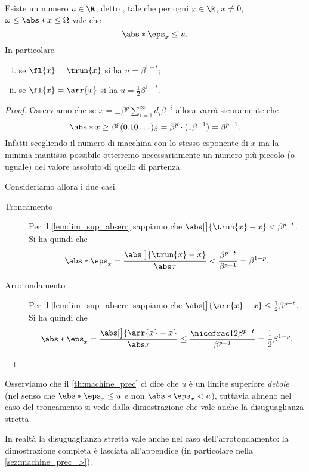 \begin{theorem}
    \label{th:machine_prec}
    Esiste un numero $u \in \R$, detto , tale che per ogni $x \in \R$, $x \neq 0$, $\omega \leq \abs*{x}\leq \Omega$ vale che \[
        \abs*{\eps_x} \leq u.
    \] In particolare \begin{enumerate}[(i)]
        \item se $\fl{x} = \trun{x}$ si ha $u = \beta^{1-t}$;
        \item se $\fl{x} = \arr{x}$ si ha $u = \frac12\beta^{1-t}$. 
    \end{enumerate}
\end{theorem}
\begin{proof}
    Osserviamo che se $x = \pm\beta^p \sum_{i=1}^\infty d_i\beta^{-i}$ allora varrà sicuramente che \[
        \abs*{x} \geq \beta^p (0.10\dots)_\beta = \beta^p \cdot (1 \beta^{-1}) = \beta^{p-1}.
    \] Infatti scegliendo il numero di macchina con lo stesso esponente di $x$ ma la minima mantissa possibile otterremo necessariamente un numero più piccolo (o uguale) del valore assoluto di quello di partenza.

    Consideriamo allora i due casi.
    \begin{description}
        \item[Troncamento] Per il \autoref{lem:lim_sup_abserr} sappiamo che $\abs[\big]{\trun{x} - x} < \beta^{p-t}$. Si ha quindi che \[
                \abs*{\eps_x} 
            = \frac{\abs[\big]{\trun{x} - x}}{\abs x} 
            < \frac{\beta^{p-t}}{\beta^{p-1}}
            = \beta^{1-p}.
        \] 
        \item[Arrotondamento] Per il \autoref{lem:lim_sup_abserr} sappiamo che $\abs[\big]{\arr{x} - x} \leq \frac12\beta^{p-t}$. Si ha quindi che \[
                 \abs*{\eps_x} 
            =    \frac{\abs[\big]{\arr{x} - x}}{\abs x} 
            \leq \frac{\nicefrac12\beta^{p-t}}{\beta^{p-1}}
            =    \frac12\beta^{1-p}. \qedhere
        \]
    \end{description}
\end{proof}

Osserviamo che il \autoref{th:machine_prec} ci dice che $u$ è un limite superiore \emph{debole} (nel senso che $\abs*{\eps_x} \leq u$ e non $\abs*{\eps_x} < u$), tuttavia almeno nel caso del troncamento si vede dalla dimostrazione che vale anche la disuguaglianza stretta. 

In realtà la disuguaglianza stretta vale anche nel caso dell'arrotondamento: la dimostrazione completa è lasciata all'appendice (in particolare nella \autoref{sez:machine_prec_>}).
 

